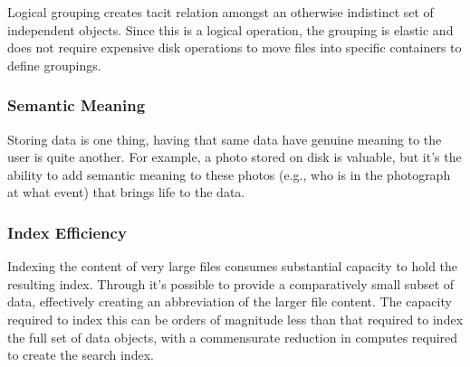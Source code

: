 Logical grouping creates tacit relation amongst an otherwise indistinct set of independent objects. Since this is a logical operation, the grouping is elastic and does not require expensive disk operations to move files into specific containers to define groupings.

\subsubsection{Semantic Meaning} \label{s:sm}
Storing data is one thing, having that same data have genuine meaning to the user is quite another. For example, a photo stored on disk is valuable, but it's the ability to add semantic meaning to these photos (e.g., who is in the photograph at what event) that brings life to the data.

\subsubsection{Index Efficiency}
Indexing the content of very large files consumes substantial capacity to hold the resulting index. Through \md{} it's possible to provide a comparatively small subset of data, effectively creating an abbreviation of the larger file content. The capacity required to index this \md{} can be orders of magnitude less than that required to index the full set of data objects, with a commensurate reduction in computes required to create the search index.

